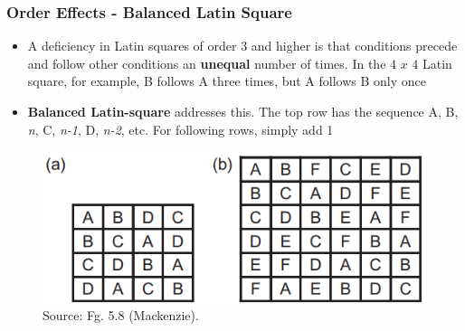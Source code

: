\documentclass{beamer}
\begin{document}
\begin{frame}
\frametitle{Order Effects - Balanced Latin Square}
\begin{itemize}
\item A deficiency in Latin squares of order 3 and higher is that conditions precede and follow other conditions an \textbf{unequal} number of times. In the 4 $ x $ 4 Latin square, for example, B follows A three times, but A follows B only once 
\item \textbf{Balanced Latin-square} addresses this. The top row has the sequence A, B, \textit{n}, C, \textit{n-1}, D, \textit{n-2}, etc. For following rows, simply add 1
\end{itemize}
\begin{figure}
\includegraphics[width=0.5\linewidth]{balanced}
\caption{Source: Fg. 5.8 (Mackenzie).}
\end{figure}
\end{frame}

\end{document}
